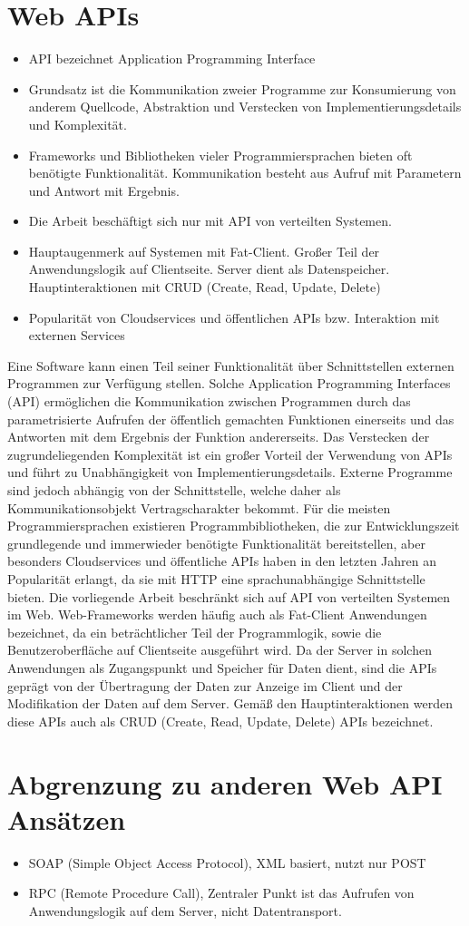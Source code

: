 \section{Web APIs}
\begin{itemize}
  \item API bezeichnet Application Programming Interface
  \item Grundsatz ist die Kommunikation zweier Programme zur Konsumierung von anderem Quellcode, Abstraktion und Verstecken von Implementierungsdetails und Komplexität.
  \item Frameworks und Bibliotheken vieler Programmiersprachen bieten oft benötigte Funktionalität. Kommunikation besteht aus Aufruf mit Parametern und Antwort mit Ergebnis.
  \item Die Arbeit beschäftigt sich nur mit API von verteilten Systemen.
  \item Hauptaugenmerk auf Systemen mit Fat-Client. Großer Teil der Anwendungslogik auf Clientseite. Server dient als Datenspeicher. Hauptinteraktionen mit CRUD (Create, Read, Update, Delete)
  \item Popularität von Cloudservices und öffentlichen APIs bzw. Interaktion mit externen Services
\end{itemize}
Eine Software kann einen Teil seiner Funktionalität über Schnittstellen externen Programmen zur Verfügung stellen.
Solche Application Programming Interfaces (API) ermöglichen die Kommunikation zwischen Programmen durch das parametrisierte Aufrufen der öffentlich gemachten Funktionen einerseits und das Antworten mit dem Ergebnis der Funktion andererseits.
Das Verstecken der zugrundeliegenden Komplexität ist ein großer Vorteil der Verwendung von APIs und führt zu Unabhängigkeit von Implementierungsdetails.
Externe Programme sind jedoch abhängig von der Schnittstelle, welche daher als Kommunikationsobjekt Vertragscharakter bekommt.
Für die meisten Programmiersprachen existieren Programmbibliotheken, die zur Entwicklungszeit grundlegende und immerwieder benötigte Funktionalität bereitstellen, aber besonders Cloudservices und öffentliche APIs haben in den letzten Jahren an Popularität erlangt, da sie mit HTTP eine sprachunabhängige Schnittstelle bieten.
Die vorliegende Arbeit beschränkt sich auf API von verteilten Systemen im Web.
Web-Frameworks werden häufig auch als Fat-Client Anwendungen bezeichnet, da ein beträchtlicher Teil der Programmlogik, sowie die Benutzeroberfläche auf Clientseite ausgeführt wird.
Da der Server in solchen Anwendungen als Zugangspunkt und Speicher für Daten dient, sind die APIs geprägt von der Übertragung der Daten zur Anzeige im Client und der Modifikation der Daten auf dem Server.
Gemäß den Hauptinteraktionen werden diese APIs auch als CRUD (Create, Read, Update, Delete) APIs bezeichnet.

\section{Abgrenzung zu anderen Web API Ansätzen}
\begin{itemize}
  \item SOAP (Simple Object Access Protocol), XML basiert, nutzt nur POST
  \item RPC (Remote Procedure Call), Zentraler Punkt ist das Aufrufen von Anwendungslogik auf dem Server, nicht Datentransport.
\end{itemize}
